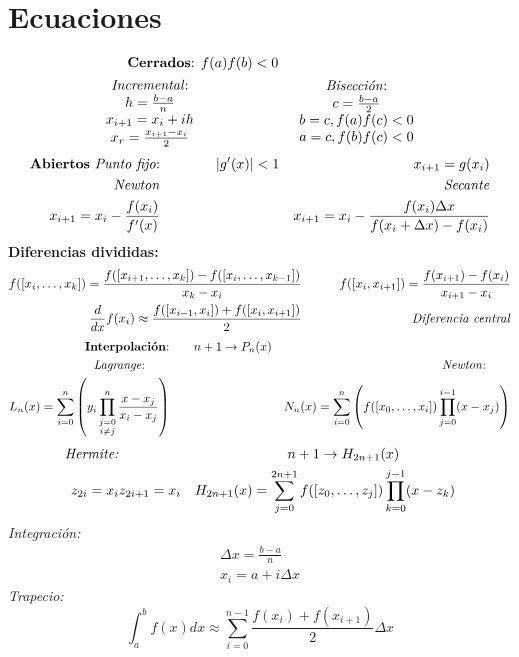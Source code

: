 \documentclass[12pt]{article}
\begin{document}
  \section*{Ecuaciones}
\begin{align*}
  \text{\textbf{Cerrados}: } & f(a)f(b)<0 &  \\
  \begin{array}{c}
  \text{\textit{Incremental}:}\\
  h = \frac{b-a}{n} \\
  x_{i+1} = x_i + ih\\
  x_r = \frac{x_{i+1}-x_i}{2}
  \end{array}
  & \qquad \qquad &
  \begin{array}{c}
  \text{\textit{Bisección}:}\\
  c = \frac{b-a}{2}\\
  b = c, f(a)f(c)<0\\
  a = c, f(b)f(c)<0
  \end{array}
\end{align*}
\begin{align*}
  \text{\textbf{Abiertos} \textit{Punto fijo}:}& \qquad \qquad |g^\prime (x)| < 1 & x_{i+1} = g(x_i) \\
  \text{\textit{Newton}} & & \text{\textit{Secante}} \\
  x_{i+1} = x_i - \frac{f(x_i)}{f^\prime(x)} & \qquad \qquad &
    x_{i+1} = x_i - \frac{f(x_i)\Delta x}{f(x_i+\Delta x)-f(x_i)}
\end{align*}
  \textbf{Diferencias divididas:}
  \begin{align*}
  f([x_i, \ldots, x_k]) = \frac{f([x_{i+1}, \ldots, x_k]) - f([x_i, \ldots, x_{k-1}])}{x_k - x_i} & \qquad & f([x_i, x_{i+1}])  =  \frac{f(x_{i+1})-f(x_i)}{x_{i+1}-x_i} \\
  \frac{d}{dx}f(x_i) \approx \frac{f([x_{i-1}, x_i])+f([x_{i}, x_{i+1}])}{2} & & \text{ \textit{Diferencia central}}
  \end{align*}
\begin{align*}
\text{\textbf{Interpolación}:} & \qquad n+1 \rightarrow P_n(x) & \\
  \text{\textit{Lagrange}:} \qquad & \qquad & \text{\textit{Newton}:} \qquad \\
  L_n(x) = \sum_{i=0}^n \left(y_i\prod_{\substack{j=0 \\ i \neq j}}^n \frac{x-x_j}{x_i - x_j}\right) & & N_n(x) = \sum_{i=0}^n \left(f([x_0, \ldots, x_i]) \prod_{j=0}^{i-1}(x-x_j)\right)
\end{align*}
\begin{align*}
\text{\textit{Hermite:}} &  & n+1 \rightarrow H_{2n+1}(x) \qquad \qquad \\
z_{2i} = x_i & z_{2i+1} = x_i & H_{2n+1}(x) = \sum_{j=0}^{2n+1}f([z_0, \ldots, z_j])\prod_{k=0}^{j-1}(x - z_k)
\end{align*}
  \textit{Integración:}
  \begin{eqnarray*}
   \Delta x = \frac{b-a}{n}\\
   x_i = a + i \Delta x
  \end{eqnarray*}
  \textit{Trapecio:}
  $$\int_a^b f(x)dx \approx \sum_{i=0}^{n-1} \frac{f(x_i) + f(x_{i+1})}{2}\Delta x$$
\end{document}
